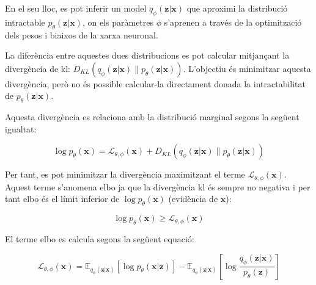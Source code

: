 \documentclass[CAT,BIB]{TFUOC}%
\begin{document}
            En el seu lloc,
            es pot inferir un model $q_\phi(\mathbf{z|x})$
            que aproximi la distribució intractable $p_\theta(\mathbf{z|x})$,
            on els paràmetres $\phi$ s'aprenen a través de la optimització
            dels pesos i biaixos de la xarxa neuronal.

            La diferència entre aquestes dues distribucions
            es pot calcular mitjançant la divergència de \gls{kl}:
            $D_{KL} ( q_\phi(\mathbf{z|x}) \| p_\theta(\mathbf{z|x}) )$.
            L'objectiu és minimitzar aquesta divergència,
            però no és possible calcular-la directament
            donada la intractabilitat de $p_\theta(\mathbf{z|x})$.

            Aquesta divergència es relaciona amb la distribució marginal
            segons la següent igualtat:

            \begin{equation}
                \label{eq:kl}
                \log p_\theta(\mathbf{x}) =
                \mathcal{L}_{\theta,\phi}(\mathbf{x}) +
                D_{KL} (
                q_\phi(\mathbf{z|x}) \|
                p_\theta(\mathbf{z|x})
                )
            \end{equation}

            Per tant, es pot minimitzar la divergència maximitzant el terme $\mathcal{L}_{\theta,\phi}(\mathbf{x})$.
            Aquest terme s'anomena \gls{elbo}
            ja que la divergència \gls{kl} és sempre no negativa i
            per tant \gls{elbo} és el límit inferior de $\log p_\theta(\mathbf{x})$
            (evidència de $\mathbf{x}$):

            \begin{equation}
                \label{eq:lim_inf}
                \log p_\theta(\mathbf{x}) \ge
                \mathcal{L}_{\theta,\phi}(\mathbf{x})
            \end{equation}

            El terme \gls{elbo} es calcula segons la següent equació:

            \begin{equation}
            \label{eq:elbo}
                \mathcal{L}_{\theta,\phi}(\mathbf{x}) =
                \mathbb{E}_{q_\phi(\mathbf{z|x})}
                    [ \log p_\theta(\mathbf{x|z}) ] -
                \mathbb{E}_{q_\phi(\mathbf{z|x})} \left[
                    \log \frac {q_\phi(\mathbf{z|x})}
                               {p_\theta(\mathbf{z})}
                \right]
            \end{equation}
\end{document}
